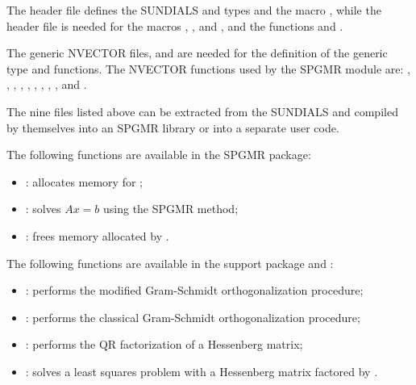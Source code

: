 \documentclass[letterpaper,10pt,english]{sphinxmanual}
\begin{document}
The  header file defines the SUNDIALS 
and  types and the macro , while the
 header file is needed for the macros ,
, and , and the functions  and .

The generic NVECTOR files,  and
 are needed for the definition of the generic
 type and functions.  The NVECTOR functions used by the
SPGMR module are: {\hyperref[nvectors/index:c.N_VDotProd]{\emph{}}}, {\hyperref[nvectors/index:c.N_VLinearSum]{\emph{}}},
{\hyperref[nvectors/index:c.N_VScale]{\emph{}}}, {\hyperref[nvectors/index:c.N_VProd]{\emph{}}}, {\hyperref[nvectors/index:c.N_VDiv]{\emph{}}},
{\hyperref[nvectors/index:c.N_VConst]{\emph{}}}, {\hyperref[nvectors/index:c.N_VClone]{\emph{}}},
, {\hyperref[nvectors/index:c.N_VDestroy]{\emph{}}}, and
.

The nine files listed above can be extracted from the SUNDIALS
 and compiled by themselves into an SPGMR library or into a
separate user code.

The following functions are available in the SPGMR package:
\begin{itemize}
\item {} 
: allocates memory for ;

\item {} 
: solves \(Ax = b\) using the SPGMR method;

\item {} 
: frees memory allocated by .

\end{itemize}

The following functions are available in the support package
 and :
\begin{itemize}
\item {} 
: performs the modified Gram-Schmidt orthogonalization
procedure;

\item {} 
: performs the classical Gram-Schmidt
orthogonalization procedure;

\item {} 
: performs the QR factorization of a Hessenberg matrix;

\item {} 
: solves a least squares problem with a Hessenberg matrix
factored by .

\end{itemize}
\end{document}
